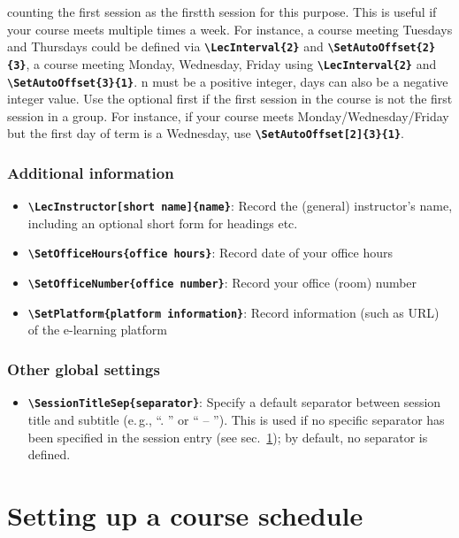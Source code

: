 \documentclass[english]{article}
\newcommand*\jmacro[1]{\textbf{\texttt{#1}}}
\newcommand*\jcsmacro[1]{\jmacro{\textbackslash{#1}}}
\newcommand*\jparam[1]{\angus #1\angud}
\begin{document}
\begin{itemize}
      counting the first session as the \jparam{first}th session for
      this purpose. This is useful if your course meets multiple times
      a week. For instance, a course meeting Tuesdays and Thursdays
      could be defined via \jcsmacro{LecInterval\{2\}} and
      \jcsmacro{SetAutoOffset\{2\}\{3\}}, a course meeting Monday,
      Wednesday, Friday using \jcsmacro{LecInterval\{2\}} and
      \jcsmacro{SetAutoOffset\{3\}\{1\}}. \jparam{n} must be a
      positive integer, \jparam{days} can also be a negative integer
      value. Use the optional \jparam{first} if the first session in
      the course is not the first session in a group. For instance, if
      your course meets Monday/Wednesday/Friday but the first day of
      term is a Wednesday, use \jcsmacro{SetAutoOffset[2]\{3\}\{1\}}.
\end{itemize}

\subsubsection{Additional information}\label{ses-add}
\begin{itemize}
\item \jcsmacro{LecInstructor[\jparam{short name}]\{\jparam{name}\}}: Record the (general) instructor's name, including an optional short form for headings etc.
\item \jcsmacro{SetOfficeHours\{\jparam{office hours}\}}: Record date of your office hours
\item \jcsmacro{SetOfficeNumber\{\jparam{office number}\}}: Record your office (room) number
\item \jcsmacro{SetPlatform\{\jparam{platform information}\}}: Record information
(such as URL) of the e-learning platform
\end{itemize}

\subsubsection{Other global settings}\label{ses-global}
\begin{itemize}
\item \jcsmacro{SessionTitleSep\{\jparam{separator}\}}: Specify a default separator between session title and subtitle (e.\,g., ``. '' or `` -- ''). This is used if no specific separator has been specified in the session entry (see sec.~\ref{sec:lecplan}); by default, no separator is defined.
\end{itemize}


\section{Setting up a course schedule}\label{sec:lecplan}
\end{document}
